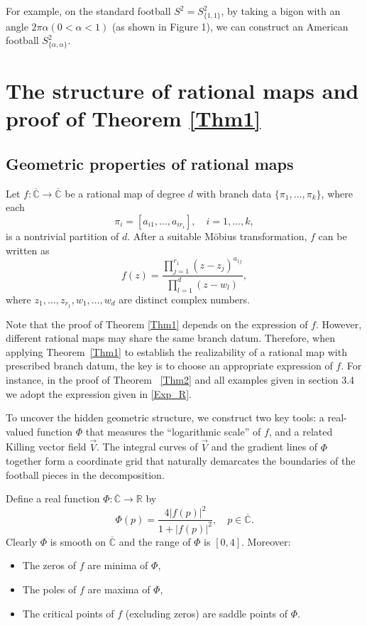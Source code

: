\documentclass[microtype]{gtpart}     %
\theoremstyle{definition}
\begin{document}
For example, on the standard football $S^{2}=S^{2}_{\{1,1\}}$, by taking a bigon with an angle $2\pi\alpha(0<\alpha<1)$ (as shown in Figure 1), we can construct an American football $S^{2}_{\{\alpha,\alpha\}}$.






\section{The structure of rational maps and proof of Theorem \ref{Thm1}}
\subsection{Geometric properties of rational maps}


Let $f: \overline{\mathbb{C}} \to \overline{\mathbb{C}}$ be a rational map of degree $d$ with branch data $\{\pi_1, \ldots, \pi_k\}$, where each
\[
\pi_i = [a_{i1}, \ldots, a_{ir_i}], \quad i = 1, \ldots, k,
\]
is a nontrivial partition of $d$. After a suitable M\"{o}bius transformation, $f$ can be written as
\begin{equation}\label{Exp_R}
f(z) = \frac{\prod\limits_{j=1}^{r_1} (z - z_j)^{a_{1j}}}{\prod\limits_{l=1}^{d} (z - w_l)},
\end{equation}
where $z_1, \ldots, z_{r_1}, w_1, \ldots, w_d$ are distinct complex numbers.


Note that the proof of Theorem \ref{Thm1} depends on the expression of
$f$. However, different rational maps may share the same branch datum. Therefore, when applying Theorem~\ref{Thm1} to establish the realizability of a rational map with prescribed branch datum, the key is to choose an appropriate expression of $f$. For instance, in the proof of Theorem ~\ref{Thm2} and all examples given in section 3.4 we adopt the expression given in \eqref{Exp_R}.



To uncover the hidden geometric structure, we construct two key tools: a real-valued function $\Phi$ that measures the ``logarithmic scale'' of $f$, and a related Killing vector field $\vec{V}$. The integral curves of $\vec{V}$ and the gradient lines of $\Phi$ together form a coordinate grid that naturally demarcates the boundaries of the football pieces in the decomposition. \par

Define a real function $\Phi: \overline{\mathbb{C}} \to \mathbb{R}$ by
\[
\Phi(p) = \frac{4|f(p)|^2}{1 + |f(p)|^2}, \quad p \in \overline{\mathbb{C}}.
\]
Clearly $\Phi$ is smooth on $\overline{\mathbb{C}}$ and the range of $\Phi$  is $[0, 4]$. Moreover:
\begin{itemize}
  \item The zeros of $f$ are minima of $\Phi$,
  \item The poles of $f$ are maxima of $\Phi$,
  \item The critical points of $f$ (excluding zeros) are saddle points of $\Phi$.
\end{itemize}
\end{document}

